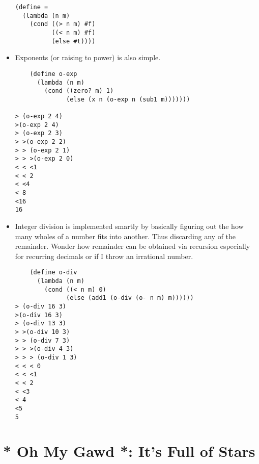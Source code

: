 \documentclass[11pt]{article}
\begin{document}
\begin{itemize}
\begin{verbatim}
(define =
  (lambda (n m)
    (cond ((> n m) #f)
          ((< n m) #f)
          (else #t))))

\end{verbatim}
\item Exponents (or raising to power) is also simple.
\begin{verbatim}
    (define o-exp
      (lambda (n m)
        (cond ((zero? m) 1)
              (else (x n (o-exp n (sub1 m)))))))

> (o-exp 2 4)
>(o-exp 2 4)
> (o-exp 2 3)
> >(o-exp 2 2)
> > (o-exp 2 1)
> > >(o-exp 2 0)
< < <1
< < 2
< <4
< 8
<16
16

\end{verbatim}

\item Integer division is implemented smartly by basically figuring out the how many wholes of a number fits into another. Thus discarding any of the
remainder. Wonder how remainder can be obtained via recursion especially for recurring decimals or if I throw an irrational number.
\begin{verbatim}
    (define o-div
      (lambda (n m)
        (cond ((< n m) 0)
              (else (add1 (o-div (o- n m) m))))))
> (o-div 16 3)
>(o-div 16 3)
> (o-div 13 3)
> >(o-div 10 3)
> > (o-div 7 3)
> > >(o-div 4 3)
> > > (o-div 1 3)
< < < 0
< < <1
< < 2
< <3
< 4
<5
5

\end{verbatim}
\end{itemize}






































\newpage

\section{* Oh My Gawd *: It's Full of Stars}
\label{sec:orgcd99708}
\end{document}
